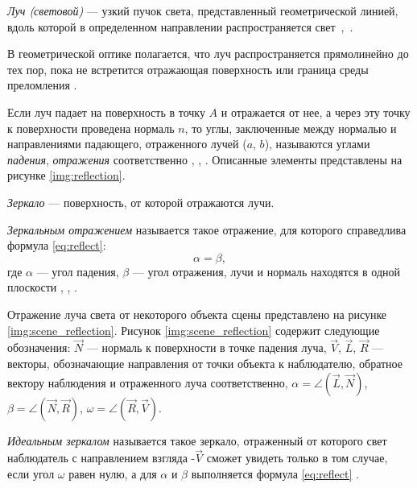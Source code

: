 \textit{Луч (световой)} --- узкий пучок света, представленный геометрической линией, вдоль которой в определенном направлении распространяется свет~\cite{тюрин2005физика},~\cite{оптика20036}. 

В геометрической оптике полагается, что луч распространяется прямолинейно до тех пор, пока не встретится отражающая поверхность или граница среды преломления \cite{порев2002компьютерная}.

Если луч падает на поверхность в точку $A$ и отражается от нее, а через эту точку к поверхности проведена нормаль $n$, то углы, заключенные между нормалью и направлениями падающего, отраженного лучей ($a$, $b$), называются углами \textit{падения}, \textit{отражения} соответственно \cite{тюрин2005физика}, \cite{оптика20036}, \cite{rodionov}.
Описанные элементы представлены на рисунке \ref{img:reflection}.


\textit{Зеркало} --- поверхность, от которой отражаются лучи.

\textit{Зеркальным отражением} называется такое отражение, для которого справедлива формула \ref{eq:reflect}:
\begin{equation}\label{eq:reflect}
	\alpha=\beta,
\end{equation}
где $\alpha$ --- угол падения, $\beta$ --- угол отражения, лучи и нормаль находятся в одной плоскости \cite{порев2002компьютерная}, \cite{оптика20036}, \cite{rodionov}.

Отражение луча света от некоторого объекта сцены представлено на рисунке \ref{img:scene_reflection}.
Рисунок \ref{img:scene_reflection} содержит следующие обозначения: $\overrightarrow N$ --- нормаль к поверхности в точке падения луча, $\overrightarrow V$, $\overrightarrow L$, $\overrightarrow R$ --- векторы, обозначающие направления от точки объекта к наблюдателю, обратное вектору наблюдения и отраженного луча соответственно, $\alpha = \angle (\overrightarrow{L}, \overrightarrow{N})$, $\beta = \angle (\overrightarrow{N}, \overrightarrow{R})$, $\omega = \angle (\overrightarrow{R}, \overrightarrow{V})$.


\textit{Идеальным зеркалом} называется такое зеркало, отраженный от которого свет наблюдатель с направлением взгляда -$\overrightarrow V$ сможет увидеть только в том случае, если угол $\omega$ равен нулю, а для $\alpha$ и $\beta$ выполняется формула \ref{eq:reflect} \cite{демин2011}.

